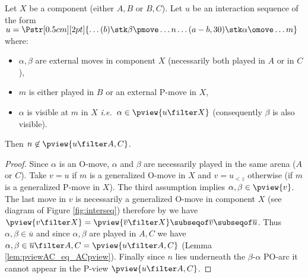 \begin{lemma}
\label{lem:interjump}
Let $X$ be a component (either  $A,B$ or  $B,C$).
Let $u$ be an interaction sequence of the form
$ u =
\Pstr[0.5cm][2pt]{ \ldots (b){\stk \beta \pmove}  \ldots
 {n}  \ldots  (a-b,30){\stk \alpha\omove}
\ldots m}$ where:
\begin{itemize}[-]
\item $\alpha,\beta$ are external moves in component $X$ (necessarily both played in $A$ or in $C$),
\item  $m$ is either played in $B$ or an external P-move in $X$,
\item  $\alpha$ is visible at $m$ in $X$ \emph{i.e.}~$\alpha\in \pview{u \filter X}$ (consequently $\beta$ is also visible).
\end{itemize}
Then $n \not\in \pview{u \filter A, C}$.
\end{lemma}
\begin{proof}
Since $\alpha$ is an O-move, $\alpha$ and $\beta$ are necessarily
played in the same arena ($A$ or $C$). Take $v=u$ if $m$ is a
generalized O-move in $X$ and $v=u_{<z}$ otherwise (if $m$ is a
generalized P-move in $X$). The third assumption implies
$\alpha,\beta\in \pview{v}$. The last move in $v$ is necessarily a
generalized O-move in component $X$ (see diagram of Figure
\ref{fig:interseq}) therefore by \cite[Lemma 3.3.1]{Harmer2005} we
have $\pview{v \filter X} = \pview{\overline{v} \filter X} \subseqof
\overline{v} \subseqof \overline{u}$. Thus $\alpha,\beta \in
\overline{u}$ and since $\alpha,\beta$ are played in $A,C$ we have
$\alpha,\beta  \in \overline{u} \filter A,C = \pview{u
\filter A,C}$ (Lemma \ref{lem:pviewAC_eq_ACpview}). Finally
since $n$ lies underneath the $\beta$-$\alpha$ PO-arc it cannot
appear in the P-view  $\pview{u \filter A,C}$.
\end{proof}


